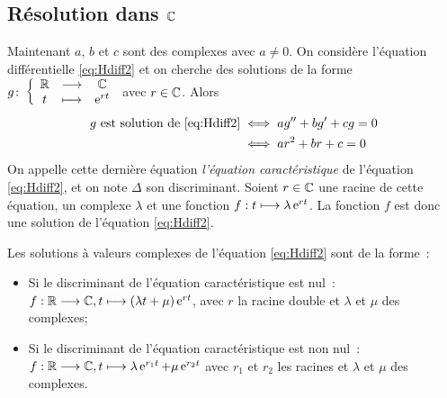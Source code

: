 \subsection{Résolution dans \(\mathbb{C}\)}
\label{subsec:resdansC}
Maintenant \(a\), \(b\) et \(c\) sont des complexes avec \(a \neq 0\). On considère l'équation différentielle \eqref{eq:Hdiff2} et on cherche des solutions de la forme \(g\colon \left\{\begin{array}{ccc} \mathbb{R} & \longrightarrow &\mathbb{C}\\ t & \longmapsto & \operatorname{e}^{rt} \end{array} \right.\) avec \(r \in \mathbb{C}\). Alors 
\begin{align}
  g\text{~est solution de } \eqref{eq:Hdiff2} & \iff ag'' + bg'+cg=0  \\ 
                                              & \iff ar^2+br+c=0
\end{align}
On appelle cette dernière équation \emph{l'équation caractéristique} de l'équation \eqref{eq:Hdiff2}, et on note \(\Delta\) son discriminant. Soient \(r \in \mathbb{C}\) une racine de cette équation, un complexe \(\lambda\) et une fonction \(f:t \longmapsto \lambda \operatorname{e}^{rt}\). La fonction \(f\) est donc une solution de l'équation \eqref{eq:Hdiff2}.
%
\begin{theo}
  \label{theo:5} 
  Les solutions à valeurs complexes de l'équation \eqref{eq:Hdiff2} sont de la forme~:
  \begin{itemize}
      \item Si le discriminant de l'équation caractéristique est nul~: \(f:\mathbb{R} \longrightarrow \mathbb{C}, t \longmapsto (\lambda t + \mu)\operatorname{e}^{rt}\), avec \(r\) la racine double et \(\lambda\) et \(\mu\) des complexes;
      \item Si le discriminant de l'équation caractéristique est non nul~: \(f:\mathbb{R} \longrightarrow \mathbb{C}, t \longmapsto \lambda \operatorname{e}^{r_1 t} + \mu \operatorname{e}^{r_2 t}\) avec \(r_1\) et \(r_2\) les racines et \(\lambda\) et \(\mu\) des complexes.
  \end{itemize}
\end{theo}
